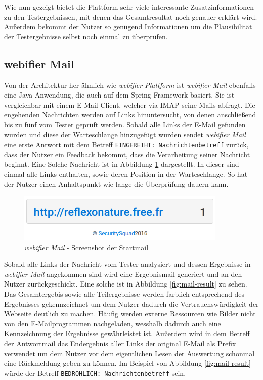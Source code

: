 Wie nun gezeigt bietet die Plattform sehr viele interessante Zusatzinformationen zu den Testergebnissen, mit denen das Gesamtresultat noch genauer erklärt wird. Außerdem bekommt der Nutzer so genügend Informationen um die Plausibilität der Testergebnisse selbst noch einmal zu überprüfen.

\subsection{webifier Mail}

Von der Architektur her ähnlich wie \textit{webifier Plattform} ist \textit{webifier Mail} ebenfalls eine Java-Anwendung, die auch auf dem Spring-Framework basiert. Sie ist vergleichbar mit einem E-Mail-Client, welcher via \acs{IMAP} seine Mails abfragt. Die engehenden Nachrichten werden auf Links hinuntersucht, von denen anschließend bis zu fünf vom Tester geprüft werden. Sobald alle Links der E-Mail gefunden wurden und diese der Warteschlange hinzugefügt wurden sendet \textit{webifier Mail} eine erste Antwort mit dem Betreff \lstinline[style=eclipse]{EINGEREIHT: Nachrichtenbetreff} zurück, dass der Nutzer ein Feedback bekommt, dass die Verarbeitung seiner Nachricht beginnt. Eine Solche Nachricht ist in Abbildung \ref{fig:mail-start} dargestellt. In dieser sind einmal alle Links enthalten, sowie deren Position in der Warteschlange. So hat der Nutzer einen Anhaltspunkt wie lange die Überprüfung dauern kann.

\begin{figure}[H]
	\centering
	\includegraphics[width=10cm]{images/mail-start.png}
	\caption{\textit{webifier Mail} - Screenshot der Startmail}
	\label{fig:mail-start}
\end{figure}

Sobald alle Links der Nachricht vom Tester analysiert und dessen Ergebnisse in \textit{webifier Mail} angekommen sind wird eine Ergebnismail generiert und an den Nutzer zurückgeschickt. Eine
solche ist in Abbildung \ref{fig:mail-result} zu sehen. Das Gesamtergebis sowie alle Teilergebnisse
werden farblich entsprechend des Ergebnisses gekennzeichnet um dem Nutzer dadurch die
Vertrauenswürdigkeit der Webseite deutlich zu machen. Häufig werden externe Ressourcen wie Bilder
nicht von den E-Mailprogrammen nachgeladen, wesshalb dadurch auch eine Kennzeichnung der Ergebnisse
gewährleistet ist. Außerdem wird in dem Betreff der Antwortmail das Endergebnis aller Links der
original E-Mail als Prefix verwendet um dem Nutzer vor dem eigentlichen Lesen der Auswertung
schonmal eine Rückmeldung geben zu können. Im Beispiel von Abbildung \ref{fig:mail-result} würde
der Betreff \lstinline[style=eclipse]{BEDROHLICH: Nachrichtenbetreff} sein.

